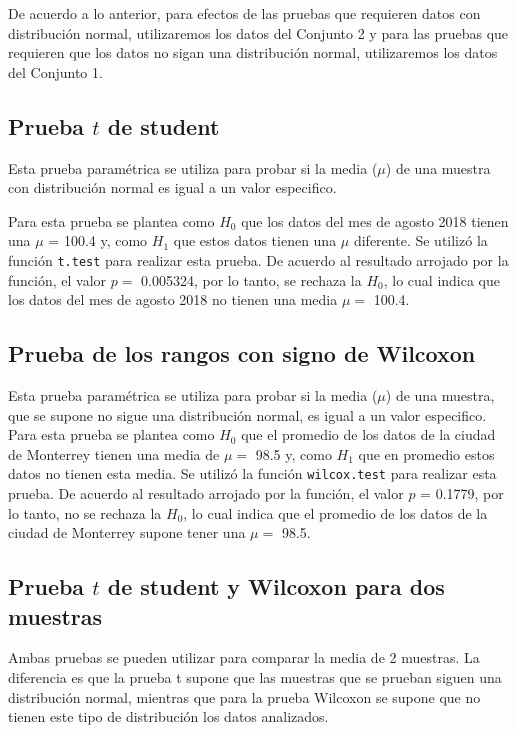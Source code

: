 \documentclass{article}
\begin{document}
De acuerdo a lo anterior, para efectos de las pruebas que requieren datos con distribución normal, utilizaremos los datos del Conjunto 2 y para las pruebas que requieren que los datos no sigan una distribución normal, utilizaremos los datos del Conjunto 1.

\subsection{Prueba $t$ de student}
    
Esta prueba paramétrica se utiliza para probar si la media ($\mu$) de una muestra con distribución normal es igual a un valor especifico.

Para esta prueba se plantea como $H_{0}$ que los datos del mes de agosto 2018 tienen una $\mu$ = 100.4 y, como $H_{1}$ que estos datos tienen una $\mu$ diferente. Se utilizó la función \texttt{t.test} para realizar esta prueba. De acuerdo al resultado arrojado por la función, el valor $p =$ 0.005324, por lo tanto, se rechaza la $H_{0}$, lo cual indica que los datos del mes de agosto 2018 no tienen una media $\mu =$ 100.4. 

\subsection{Prueba de los rangos con signo de Wilcoxon}
    
Esta prueba paramétrica se utiliza para probar si la media ($\mu$) de una muestra, que se supone no sigue una distribución normal, es igual a un valor especifico. Para esta prueba se plantea como $H_{0}$ que el promedio de los datos de la ciudad de Monterrey tienen una media de $\mu =$ 98.5 y, como $H_{1}$ que en promedio estos datos no tienen esta media. Se utilizó la función \texttt{wilcox.test} para realizar esta prueba. De acuerdo al resultado arrojado por la función, el valor $p$ = 0.1779, por lo tanto, no se rechaza la $H_{0}$, lo cual indica que el promedio de los datos de la ciudad de Monterrey supone tener una $\mu =$ 98.5.
    
\subsection{Prueba $t$ de student y Wilcoxon para dos muestras}
    
Ambas pruebas se pueden utilizar para comparar la media de 2 muestras. La diferencia es que la prueba t supone que las muestras que se prueban siguen una distribución normal, mientras que para la prueba Wilcoxon se supone que no tienen este tipo de distribución los datos analizados.
    
\end{document}
